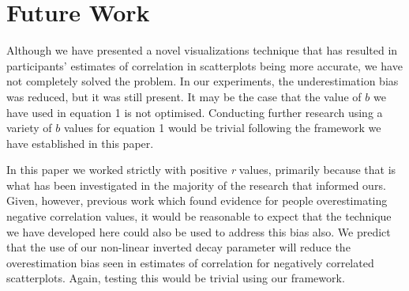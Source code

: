 \documentclass[preprint, 3p,
authoryear]{elsarticle} %
\begin{document}
\hypertarget{future-work}{%
\section{Future Work}\label{future-work}}

Although we have presented a novel visualizations technique that has
resulted in participants' estimates of correlation in scatterplots being
more accurate, we have not completely solved the problem. In our
experiments, the underestimation bias was reduced, but it was still
present. It may be the case that the value of \(b\) we have used in
equation 1 is not optimised. Conducting further research using a variety
of \(b\) values for equation 1 would be trivial following the framework
we have established in this paper.

In this paper we worked strictly with positive \emph{r} values,
primarily because that is what has been investigated in the majority of
the research that informed ours. Given, however, previous work
\citep{sher_2017} which found evidence for people overestimating
negative correlation values, it would be reasonable to expect that the
technique we have developed here could also be used to address this bias
also. We predict that the use of our non-linear inverted decay parameter
will reduce the overestimation bias seen in estimates of correlation for
negatively correlated scatterplots. Again, testing this would be trivial
using our framework.

\renewcommand\refname{References}

\end{document}
